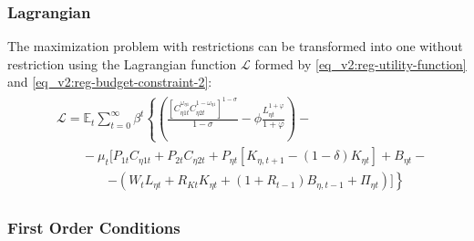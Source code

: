 \documentclass[../thesis.tex]{subfiles}
\begin{document}
\subsubsection*{Lagrangian}

The maximization problem with restrictions can be transformed into one without restriction using the Lagrangian function $\mathcal{L}$ formed by \ref{eq_v2:reg-utility-function} and \ref{eq_v2:reg-budget-constraint-2}:
\begin{align}
	\begin{split}
	& \mathcal{L} = \mathbb{E}_t \sum_{t=0}^{\infty} \beta^t \left\{ \left( \frac{ \left[ C_{\eta 1 t}^{\omega_{\eta 1}} C_{\eta 2 t}^{1-\omega_{\eta 1}} \right]^{1 -\sigma}}{1 -\sigma} - \phi \frac{L_{\eta t}^{1+\varphi}}{1+\varphi} \right) \right. - \\ & \qquad - \mu_t \Big[ P_{1 t} C_{\eta 1 t} + P_{2 t} C_{\eta 2 t} + P_{\eta t} [ K_{\eta, t+1} - (1-\delta)K_{\eta t} ] + B_{\eta t} - \\ & \qquad \qquad \left. - ( W_t L_{\eta t} + R_{Kt} K_{\eta t} + (1 + R_{t-1}) B_{\eta,t-1} + \Pi_{\eta t} ) \Big] \right\} \label{eq_v2:reg-household-lagrangian}
	\end{split}
\end{align}

\subsubsection*{First Order Conditions}
\end{document}
